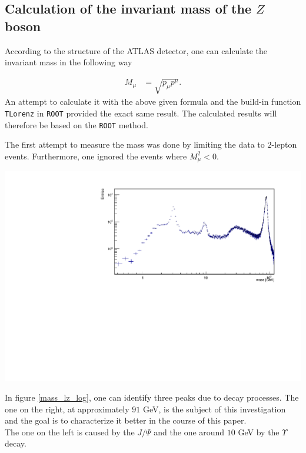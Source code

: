 \documentclass[12pt, a4paper, bibliography=totoc]{scrartcl}
\begin{document}
\begin{multicols}{2}
\subsection{Calculation of the invariant mass of the $Z$ boson}
According to the structure of the ATLAS detector, one can calculate the invariant mass in the following way

\begin{align}
	M_{\mu} &= \sqrt{p_{\mu}p^{\mu}}. 
\end{align}
An attempt to calculate it with the above given formula and the build-in function \verb*+TLorenz+ in \verb*+ROOT+ provided the exact same result. 
The calculated results will therefore be based on the \verb*+ROOT+ method.

The first attempt to measure the mass was done by limiting the data to $2$-lepton events. 
Furthermore, one ignored the events where $M_{\mu}^{2} < 0$. 
\begin{center}
	\includegraphics[width=\linewidth]{fig/invar_mass_dist_corrected_axis_title.pdf}
	\label{mass_lz_log}
\end{center}

In figure \ref{mass_lz_log}, one can identify three peaks due to decay processes. 
The one on the right, at approximately $91$ \si{GeV}, is the subject of this investigation and the goal is to characterize it better in the course of this paper.\\
The one on the left is caused by the $J/{\Psi}$ and the one around $10$ \si{GeV} by the $\Upsilon$ decay. 


\end{multicols}
\end{document}
